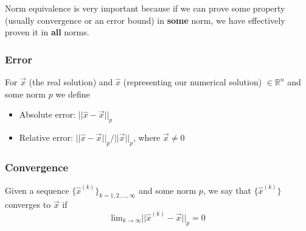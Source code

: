 \documentclass[12pt]{article}
\begin{document}
%

Norm equivalence is very important because if we can prove some property (usually convergence or an error bound) in \textbf{some} norm, we have effectively proven it in \textbf{all} norms. 

\subsubsection{Error}
For $\vec{x}$ (the real solution) and $\hat{x}$ (representing our numerical solution) $\in \mathbb{R}^n$ and some norm $p$ we define
%
\begin{itemize}
\item Absolute error: $||\hat{x} - \vec{x}||_p$
\item Relative error: $||\hat{x} - \vec{x}||_p / ||\vec{x}||_p$, where $\vec{x} \neq 0$
\end{itemize}

\subsubsection{Convergence}
Given a sequence $\lbrace \hat{x}^{(k)} \rbrace_{k=1,2,\dots,\infty}$ and some norm $p$, we say that $\lbrace \hat{x}^{(k)} \rbrace$ converges to $\vec{x}$ if
%
\begin{equation}
\displaystyle\text{lim}_{k \rightarrow \infty} ||\hat{x}^{(k)} - \vec{x}||_p = 0 \nonumber
\end{equation}
\end{document}
